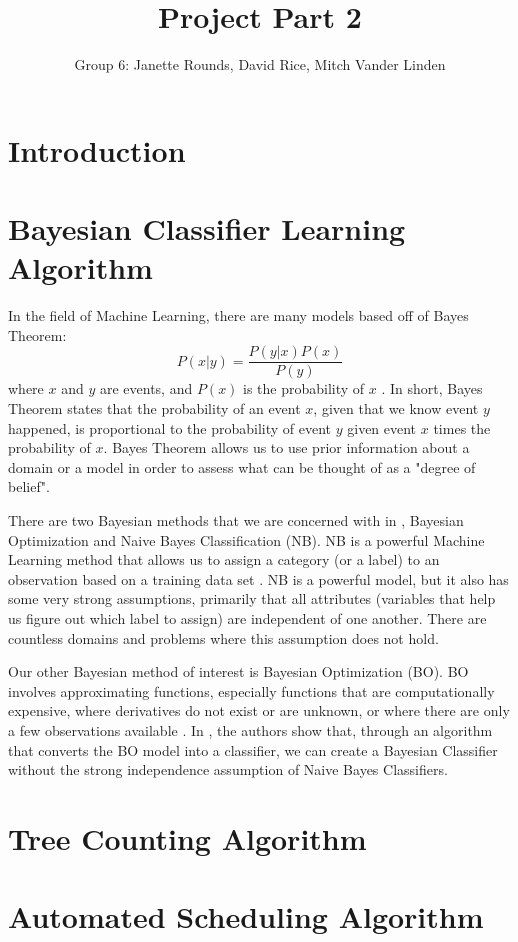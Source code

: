 \documentclass[]{article}
\title{Project Part 2}
\author{Group 6: Janette Rounds, David Rice, Mitch Vander Linden}
\begin{document}
\maketitle

\section{Introduction}

\section{Bayesian Classifier Learning Algorithm}
In the field of Machine Learning, there are many models based off of Bayes Theorem: 
$$P(x|y) = \frac{P(y|x)P(x)}{P(y)}$$ where $x$ and $y$ are events, and $P(x)$ is the probability of $x$ \cite{koller2009probabilistic}.  In short, Bayes Theorem states that the probability of an event $x$, given that we know event $y$ happened, is proportional to the probability of event $y$ given event $x$ times the probability of $x$. Bayes Theorem allows us to use prior information about a domain or a model in order to assess what can be thought of as a "degree of belief". 

There are two Bayesian methods that we are concerned with in \cite[Liu 2013]{liu2013bayesian}, Bayesian Optimization and Naive Bayes Classification (NB).  NB is a powerful Machine Learning method that allows us to assign a category (or a label) to an observation based on a training data set \cite{koller2009probabilistic}. NB is a powerful model, but it also has some very strong assumptions, primarily that all attributes (variables that help us figure out which label to assign) are independent of one another. There are countless domains and problems where this assumption does not hold. 

Our other Bayesian method of interest is Bayesian Optimization (BO). BO involves approximating functions, especially functions that are computationally expensive, where derivatives do not exist or are unknown, or where there are only a few observations available \cite{brochu2010tutorial}. In \cite[Liu 2013]{liu2013bayesian}, the authors show that, through an algorithm that converts the BO model into a classifier, we can create a Bayesian Classifier without the strong independence assumption of Naive Bayes Classifiers. 

\section{Tree Counting Algorithm}
\cite[Santoro 2013]{santoro2013tree}
\section{Automated Scheduling Algorithm}
\cite[Casadesus 2012]{casadesus2012drip}


\end{document}
